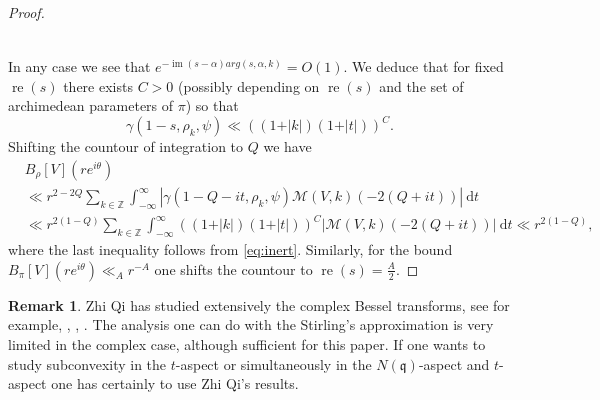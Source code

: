 \documentclass[a4paper,11pt]{amsart}
\theoremstyle{definition}
\newtheorem{remark}[theorem]{Remark}
\newcommand{\Z}{\mathbb{Z}}
\newcommand{\imag}{\operatorname{im}}
\newcommand{\real}{\operatorname{re}}
\begin{document}
\begin{proof}
\begin{itemize}
\begin{align*}
        \end{align*}
         \end{itemize}
        In any case we see that $e^{-\imag(s-\alpha)arg(s,\alpha,k)} = O(1)$. We deduce that for fixed $\real(s)$ there exists $C>0$ (possibly depending on $\real(s)$ and the set of archimedean parameters of $\pi$) so that 
        \[\gamma(1-s,\rho_k,\psi) \ll \left((1+\vert{k}\vert)(1+\vert{t}\vert)\right)^C. \]
        Shifting the countour of integration to $Q$ we have 
        \begin{align*}
            &B_{\rho}[V](re^{i\theta}) \\ &\ll r^{2-2Q}\sum_{k\in \Z}\int_{-\infty}^{\infty}\left\vert{\gamma(1-Q-it,\rho_k,\psi) \mathcal{M}(V,k)(-2(Q+it))}\right\vert \ \mathrm{d}t \\ &\ll r^{2(1-Q)}\sum_{k\in\Z}\int_{-\infty}^{\infty}\left((1+\vert{k}\vert)(1+\vert{t}\vert)\right)^C\vert{\mathcal{M}(V,k)(-2(Q+it))}\vert \ \mathrm{d}t \ll r^{2(1-Q)},
        \end{align*}
        where the last inequality follows from \eqref{eq:inert}.
        Similarly, for the bound $B_{\pi}[V](re^{i\theta}) \ll_A r^{-A}$ one shifts the countour to $\real(s) = \frac{A}{2}$.  
       
    \end{proof}
        \begin{remark}\label{rmk:complexbesseltransform}
        Zhi Qi has studied extensively the complex Bessel transforms, see for example, \cite{qi2021theory}, \cite{Qi2019}, \cite{Qi2024}. The analysis one can do with the Stirling's approximation is very limited in the complex case, although sufficient for this paper. If one wants to study subconvexity in the $t$-aspect or simultaneously in the $N(\mathfrak{q})$-aspect and $t$-aspect one has certainly to use Zhi Qi's results.  
    \end{remark}
\end{document}
